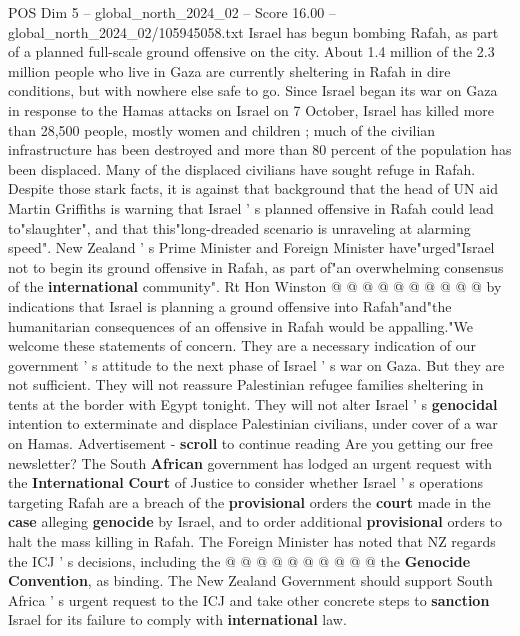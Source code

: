 \begin{textsample}{POS Dim 5 – global\_north\_2024\_02 – Score 16.00 – global\_north\_2024\_02/105945058.txt}  \label{ex:f5_pos_238}
Israel has begun bombing Rafah, as part of a planned full-scale ground offensive on the city.
About 1.4 million of the 2.3 million people who live in Gaza are currently sheltering in Rafah in dire conditions, but with nowhere else safe to go.
Since Israel began its war on Gaza in response to the Hamas attacks on Israel on 7 October, Israel has killed more than 28,500 people, mostly women and children ; much of the civilian infrastructure has been destroyed and more than 80 percent of the population has been displaced.
Many of the displaced civilians have sought refuge in Rafah.
Despite those stark facts, it is against that background that the head of UN aid Martin Griffiths is warning that Israel ' s planned offensive in Rafah could lead to"slaughter", and that this"long-dreaded scenario is unraveling at alarming speed".
New Zealand ' s Prime Minister and Foreign Minister have"urged"Israel not to begin its ground offensive in Rafah, as part of"an overwhelming consensus of the \textbf{international} community".
Rt Hon Winston @ @ @ @ @ @ @ @ @ @ by indications that Israel is planning a ground offensive into Rafah"and"the humanitarian consequences of an offensive in Rafah would be appalling."We welcome these statements of concern.
They are a necessary indication of our government ' s attitude to the next phase of Israel ' s war on Gaza.
But they are not sufficient.
They will not reassure Palestinian refugee families sheltering in tents at the border with Egypt tonight.
They will not alter Israel ' s \textbf{genocidal} intention to exterminate and displace Palestinian civilians, under cover of a war on Hamas.
Advertisement - \textbf{scroll} to continue reading Are you getting our free newsletter?
The South \textbf{African} government has lodged an urgent request with the \textbf{International} \textbf{Court} of Justice to consider whether Israel ' s operations targeting Rafah are a breach of the \textbf{provisional} orders the \textbf{court} made in the \textbf{case} alleging \textbf{genocide} by Israel, and to order additional \textbf{provisional} orders to halt the mass killing in Rafah.
The Foreign Minister has noted that NZ regards the ICJ ' s decisions, including the @ @ @ @ @ @ @ @ @ @ the \textbf{Genocide} \textbf{Convention}, as binding.
The New Zealand Government should support South Africa ' s urgent request to the ICJ and take other concrete steps to \textbf{sanction} Israel for its failure to comply with \textbf{international} law.

\end{textsample}

